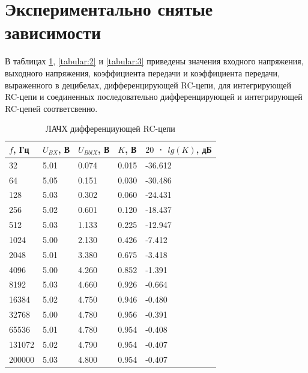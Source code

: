 \section{Экспериментально снятые зависимости}

В таблицах \ref{tabular:1}, \ref{tabular:2} и \ref{tabular:3} приведены значения входного напряжения, выходного напряжения, коэффициента передачи и коэффициента передачи, выраженного в децибелах, дифференцирующей RC-цепи, для интегрирующей RC-цепи и соединенных последовательно дифференцирующей и интегрирующей RC-цепей соответсвенно. 


\begin{table}[H]
	\begin{center}
	\caption{ЛАЧХ дифференциующей RC-цепи}
	\def\arraystretch{1.5}
		\begin{tabularx}{\textwidth}{|X|X|X|X|X|}
			\hline
			$f$, Гц & $U_{BX}$, В & $U_{BblX}$, В & $K$, В & $20$ · $lg(K)$, дБ\\\hline
			32 & 5.01 & 0.074 & 0.015 & -36.612\\\hline
			64 & 5.05 & 0.151 & 0.030 & -30.486\\\hline
			128 & 5.03 & 0.302 & 0.060 & -24.431\\\hline
			256 & 5.02 & 0.601 & 0.120 & -18.437\\\hline
			512 & 5.03 & 1.133 & 0.225 & -12.947\\\hline
			1024 & 5.00 & 2.130 & 0.426 & -7.412\\\hline
			2048 & 5.01 & 3.380 & 0.675 & -3.418\\\hline
			4096 & 5.00 & 4.260 & 0.852 & -1.391\\\hline
			8192 & 5.03 & 4.660 & 0.926 & -0.664\\\hline
			16384 & 5.02 & 4.750 & 0.946 & -0.480\\\hline
			32768 & 5.00 & 4.780 & 0.956 & -0.391\\\hline
			65536 & 5.01 & 4.780 & 0.954 & -0.408\\\hline
			131072 & 5.02 & 4.790 & 0.954 & -0.407\\\hline
			200000 & 5.03 & 4.800 & 0.954 & -0.407\\\hline	
		\end{tabularx}
		\label{tabular:1}
	\end{center}
\end{table}

